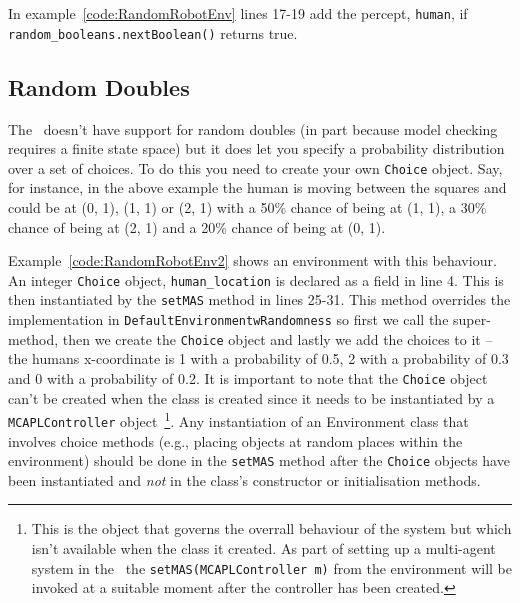 \begin{sloppypar}
In example~\ref{code:RandomRobotEnv} lines 17-19 add the percept, \lstinline{human}, if \texttt{random\_booleans.nextBoolean()} returns true.
\end{sloppypar}

\subsection{Random Doubles}
The \ail\ doesn't have support for random doubles (in part because model checking requires a finite state space) but it does let you specify a probability distribution over a set of choices.  To do this you need to create your own \texttt{Choice} object.  Say, for instance, in the above example the human is moving between the squares and could be at (0, 1), (1, 1) or (2, 1) with a 50\% chance of being at (1, 1), a 30\% chance of being at (2, 1) and a 20\% chance of being at (0, 1).

Example~\ref{code:RandomRobotEnv2} shows an environment with this behaviour.  An integer \texttt{Choice} object, \texttt{human\_location} is declared as a field in line 4.  This is then instantiated by the \texttt{setMAS} method in lines 25-31.  This method overrides the implementation in \texttt{DefaultEnvironmentwRandomness} so first we call the super-method, then we create the \texttt{Choice} object and lastly we add the choices to it -- the humans x-coordinate is 1 with a probability of 0.5, 2 with a probability of 0.3 and 0 with a probability of 0.2.  It is important to note that the \texttt{Choice} object can't be created when the class is created since it needs to be instantiated by a \texttt{MCAPLController} object~\footnote{This is the object that governs the overrall behaviour of the system but which isn't available when the class it created.  As part of setting up a multi-agent system in the \ail\ the \texttt{setMAS(MCAPLController m)} from the environment will be invoked at a suitable moment after the controller has been created.}.  Any instantiation of an Environment class that involves choice methods (e.g., placing objects at random places within the environment) should be done in the \texttt{setMAS} method after the \texttt{Choice} objects have been instantiated and \emph{not} in the class's constructor or initialisation methods.

